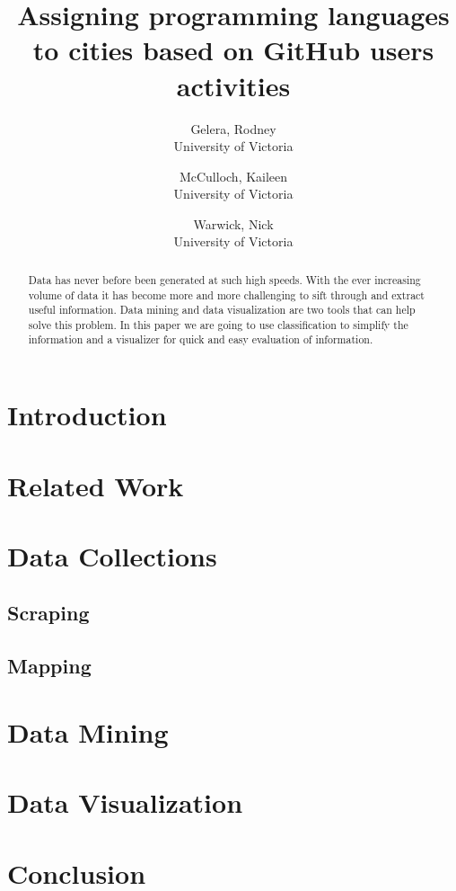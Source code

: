 \documentclass{article}
\begin{document}
\title{Assigning programming languages to cities based on GitHub users activities}

\author{
   Gelera, Rodney \\University of Victoria
   \and
   McCulloch, Kaileen \\University of Victoria
   \and
   Warwick, Nick \\University of Victoria
}

\maketitle

\tableofcontents
\newpage

\begin{abstract}
Data has never before been generated at such high speeds. With the ever increasing volume of data it has become more and more challenging to sift through and extract useful information. Data mining and data visualization are two tools that can help solve this problem. In this paper we are going to use classification to simplify the information and a visualizer for quick and easy evaluation of information.
\end{abstract}

\section{Introduction}
\section{Related Work}
\section{Data Collections}
   \subsection{Scraping}
   \subsection{Mapping}
\section{Data Mining}
\section{Data Visualization}
\section{Conclusion}
\end{document}
